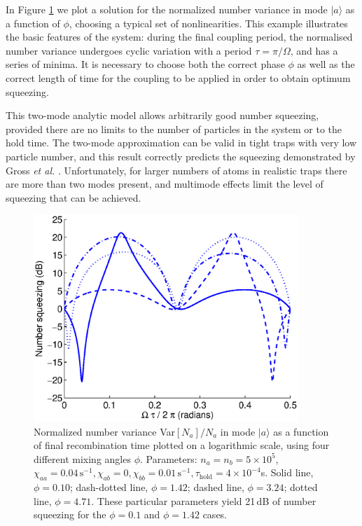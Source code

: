 \documentclass{iopart}
\begin{document}

In Figure \ref{figTwoModeAnalyticExamples} we plot a solution for the normalized number variance in mode $|a\rangle$ as a function of $\phi$, choosing a typical set of nonlinearities. This example illustrates the basic features of the system: during the final coupling period, the normalised number variance undergoes cyclic variation with a period $\tau=\pi / \Omega$, and has a series of minima. It is necessary to choose both the correct phase $\phi$ as well as the correct length of time for the coupling to be applied in order to obtain optimum squeezing.

This two-mode analytic model allows arbitrarily good number squeezing, provided there are no limits to the number of particles in the system or to the hold time. The two-mode approximation can be valid in tight traps with very low particle number, and this result correctly predicts the squeezing demonstrated by Gross \textit{et al.} \cite{Gross2010}. Unfortunately, for larger numbers of atoms in realistic traps there are more than two modes present, and multimode effects limit the level of squeezing that can be achieved.

\begin{figure}
    \centering
    \includegraphics[width=10cm]{figures/analytic_two_mode_examples.eps}
    \caption{Normalized number variance Var$[N_a]/N_a$ in mode $|a \rangle$ as a function of final recombination time plotted on a logarithmic scale, using four different mixing angles $\phi$. Parameters: $n_a = n_b =5 \times 10^5$, $\chi_{aa}=0.04\, \text{s}^{-1}, \chi_{ab}=0, \chi_{bb}=0.01\,\text{s}^{-1}, \tau_{\mathrm{hold}}=4\times 10^{-4}$s. Solid line, $\phi=0.10$; dash-dotted line, $\phi=1.42$; dashed line, $\phi=3.24$; dotted line, $\phi=4.71$. These particular parameters yield 21\,dB of number squeezing for the $\phi=0.1$ and $\phi=1.42$ cases.} 
    \label{figTwoModeAnalyticExamples}
\end{figure}
\end{document}
